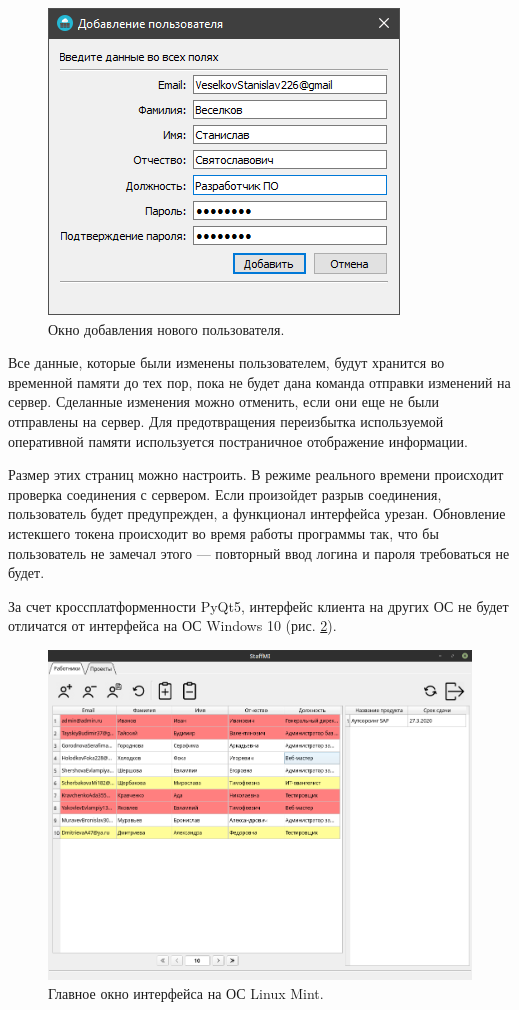 \begin{figure}[h]
    \centering
    \includegraphics[width=0.4\linewidth]{img/add_user_window_win.png}
    \caption{Окно добавления нового пользователя.}
    \label{fig:add_user_window_win}
\end{figure}

Все данные, которые были изменены пользователем, будут хранится во временной памяти до тех пор, пока не будет дана команда отправки изменений на сервер. Сделанные изменения можно отменить, если они еще не были отправлены на сервер. Для предотвращения переизбытка используемой оперативной памяти используется постраничное отображение информации.

Размер этих страниц можно настроить. В режиме реального времени происходит проверка соединения с сервером. Если произойдет разрыв соединения, пользователь будет предупрежден, а функционал интерфейса урезан. Обновление истекшего токена происходит во время работы программы так, что бы пользователь не замечал этого --- повторный ввод логина и пароля требоваться не будет.

За счет кроссплатформенности PyQt5, интерфейс клиента на других ОС не будет отличатся от интерфейса на ОС Windows 10 (рис. \ref{fig:main_window_linux}).

\begin{figure}[h]
    \centering
    \includegraphics[width=1\linewidth]{img/main_window_linux.png}
    \caption{Главное окно интерфейса на ОС Linux Mint.}
    \label{fig:main_window_linux}
\end{figure}


